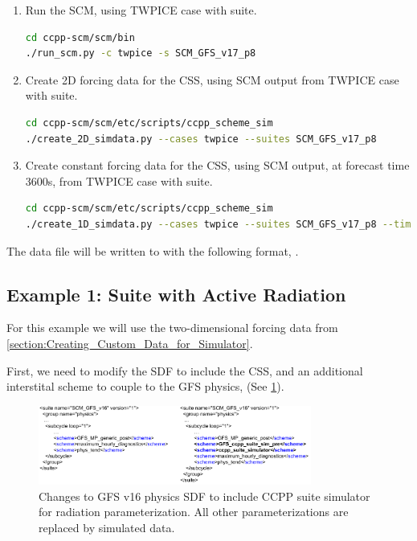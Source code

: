 \begin{enumerate}
\item Run the SCM, using TWPICE case with  suite.
\begin{lstlisting}[language=bash]
cd ccpp-scm/scm/bin
./run_scm.py -c twpice -s SCM_GFS_v17_p8
\end{lstlisting}
\item Create 2D forcing data for the CSS, using SCM output from TWPICE case with  suite.
\begin{lstlisting}[language=bash]
cd ccpp-scm/scm/etc/scripts/ccpp_scheme_sim
./create_2D_simdata.py --cases twpice --suites SCM_GFS_v17_p8
\end{lstlisting}
\item Create constant forcing data for the CSS, using SCM output, at forecast time 3600s, from TWPICE case with  suite.
\begin{lstlisting}[language=bash]
cd ccpp-scm/scm/etc/scripts/ccpp_scheme_sim
./create_1D_simdata.py --cases twpice --suites SCM_GFS_v17_p8 --time 3600
\end{lstlisting}
\end{enumerate}

The data file will be written to  with the following format, .

\subsection{Example 1: Suite with Active Radiation}
\label{section:Suite_with_Active_Radiation}

For this example we will use the two-dimensional forcing data from \ref{section:Creating_Custom_Data_for_Simulator}. 

First, we need to modify the SDF to include the CSS,  and an additional interstital scheme to couple to the GFS physics,  (See \ref{fig:CSS_SDF_ex1}).

\begin{figure}[t]
    \centering
    \includegraphics[width=0.80\textwidth]{images/SDF_changes_for_CSS_ex1.png}
    \caption{Changes to GFS v16 physics SDF to include CCPP suite simulator for  radiation parameterization. All other parameterizations are replaced by simulated data.}
    \label{fig:CSS_SDF_ex1}
\end{figure}

